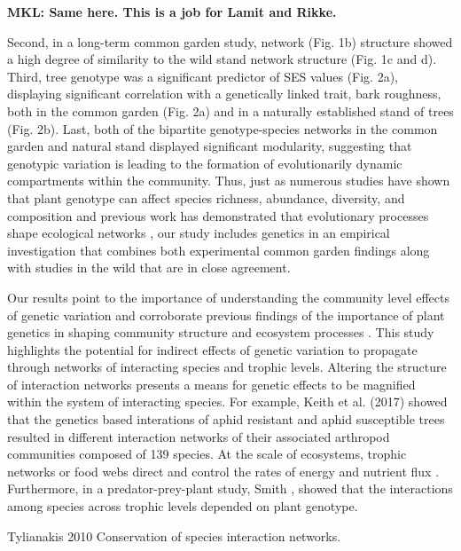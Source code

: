 \documentclass[fleqn,10pt]{wlscirep}
\begin{document}
\textbf{MKL: Same here. This is a job for Lamit and Rikke.}

Second, in a long-term common garden study, network
(Fig. 1b) structure showed a high degree of similarity to the wild
stand network structure (Fig. 1c and d). Third, tree genotype was a
significant predictor of SES values (Fig. 2a), displaying significant
correlation with a genetically linked trait, bark roughness, both in
the common garden (Fig. 2a) and in a naturally established stand of
trees (Fig. 2b). Last, both of the bipartite genotype-species networks
in the common garden and natural stand displayed significant
modularity, suggesting that genotypic variation is leading to the
formation of evolutionarily dynamic compartments within the
community. Thus, just as numerous studies have shown that plant
genotype can affect species richness, abundance, diversity, and
composition and previous work has demonstrated that evolutionary
processes shape ecological networks \cite{Guimaraes2011,
  Moya-Larano2011}, our study includes genetics in an empirical
investigation that combines both experimental common garden findings
along with studies in the wild that are in close agreement.

Our results point to the importance of understanding the community
level effects of genetic variation and corroborate previous findings
of the importance of plant genetics in shaping community structure and
ecosystem processes \cite{Whitham2006a}.  This study highlights the
potential for indirect effects of genetic variation to propagate
through networks of interacting species and trophic levels. Altering
the structure of interaction networks presents a means for genetic
effects to be magnified within the system of interacting species. For
example, Keith et al. (2017) showed that the genetics based
interations of aphid resistant and aphid susceptible trees resulted in
different interaction networks of their associated arthropod
communities composed of 139 species. At the scale of ecosystems,
trophic networks or food webs direct and control the rates of energy
and nutrient flux \cite{Borgatti2006}. Furthermore, in a
predator-prey-plant study, Smith \cite{Smith2011}, showed that the
interactions among species across trophic levels depended on plant
genotype.

Tylianakis 2010 Conservation of species interaction networks.
\end{document}
